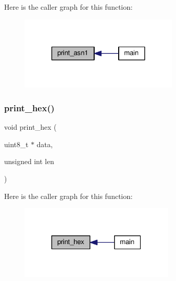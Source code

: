 Here is the caller graph for this function\+:
\nopagebreak
\begin{figure}[H]
\begin{center}
\leavevmode
\includegraphics[width=216pt]{pkg__tiny-asn1_2main_8c_ae4f7d0f99310a055172c96821890edbe_icgraph}
\end{center}
\end{figure}
\mbox{\label{pkg__tiny-asn1_2main_8c_a58093ae00f094fd066daf0ce9d67d60d}} 
\subsubsection{\texorpdfstring{print\+\_\+hex()}{print\_hex()}}
{\footnotesize\ttfamily void print\+\_\+hex (\begin{DoxyParamCaption}\item[{uint8\+\_\+t $\ast$}]{data,  }\item[{unsigned int}]{len }\end{DoxyParamCaption})}

Here is the caller graph for this function\+:
\nopagebreak
\begin{figure}[H]
\begin{center}
\leavevmode
\includegraphics[width=210pt]{pkg__tiny-asn1_2main_8c_a58093ae00f094fd066daf0ce9d67d60d_icgraph}
\end{center}
\end{figure}
